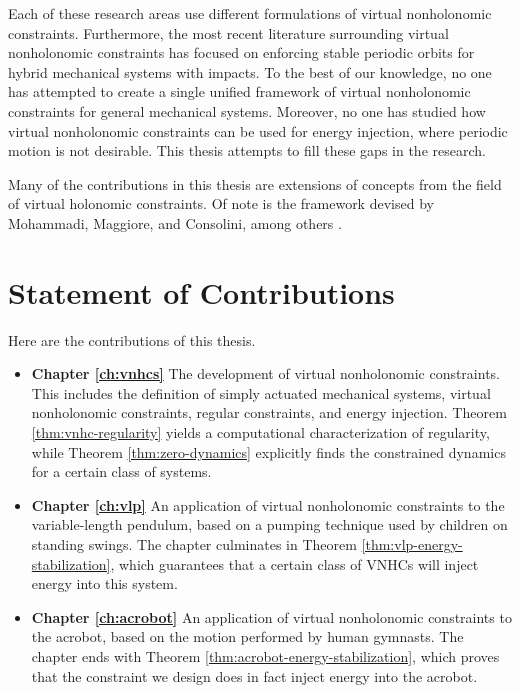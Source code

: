 Each of these research areas use different formulations of virtual
nonholonomic constraints.
Furthermore, the most recent literature surrounding virtual nonholonomic constraints
has focused on enforcing stable periodic orbits for hybrid mechanical systems
with impacts.
To the best of our knowledge, no one has attempted to create a single unified
framework of virtual nonholonomic constraints for general mechanical systems.
Moreover, no one has studied how virtual nonholonomic constraints can be used for energy
injection, where periodic motion is not desirable.
This thesis attempts to fill these gaps in the research.

Many of the contributions in this thesis are extensions of concepts from the
field of virtual holonomic constraints. 
Of note is the framework devised by Mohammadi, Maggiore, and
Consolini, among others
\cite{vhcs_for_el_systems,dynamic_vhcs_stabilize_closed_orbits,lagrangian_structure_reduced_dynamics_vhcs,xingbo_thesis}.

\section{Statement of Contributions}
Here are the contributions of this thesis.
\begin{itemize}[label={}]
   \item \textbf{Chapter \ref{ch:vnhcs}} The development of 
      virtual nonholonomic constraints.
      This includes the definition of simply actuated mechanical systems, virtual
      nonholonomic constraints, regular constraints, and energy injection.
      Theorem \ref{thm:vnhc-regularity} yields a computational characterization
      of regularity, while Theorem \ref{thm:zero-dynamics} explicitly finds the
      constrained dynamics for a certain class of systems.
   \item \textbf{Chapter \ref{ch:vlp}} An application of virtual nonholonomic
      constraints to the variable-length pendulum, based on a pumping technique
      used by children on standing swings.
      The chapter culminates in Theorem \ref{thm:vlp-energy-stabilization},
      which guarantees that a certain class of VNHCs will inject energy into
      this system.
   \item \textbf{Chapter \ref{ch:acrobot}} An application of virtual
      nonholonomic constraints to the acrobot, based on the motion performed by
      human gymnasts.
      The chapter ends with Theorem \ref{thm:acrobot-energy-stabilization},
      which proves that the constraint we design does in fact inject energy into
      the acrobot.
\end{itemize}

